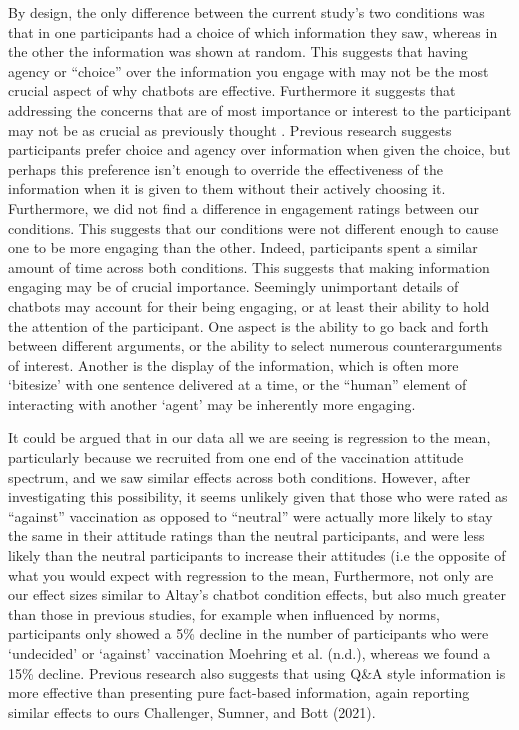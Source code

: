 \documentclass[
  english,
  ,jou,floatsintext]{apa6}
\begin{document}
By design, the only difference between the current study's two conditions was that in one participants had a choice of which information they saw, whereas in the other the information was shown at random. This suggests that having agency or ``choice'' over the information you engage with may not be the most crucial aspect of why chatbots are effective. Furthermore it suggests that addressing the concerns that are of most importance or interest to the participant may not be as crucial as previously thought . Previous research suggests participants prefer choice and agency over information when given the choice, but perhaps this preference isn't enough to override the effectiveness of the information when it is given to them without their actively choosing it. Furthermore, we did not find a difference in engagement ratings between our conditions. This suggests that our conditions were not different enough to cause one to be more engaging than the other. Indeed, participants spent a similar amount of time across both conditions. This suggests that making information engaging may be of crucial importance. Seemingly unimportant details of chatbots may account for their being engaging, or at least their ability to hold the attention of the participant. One aspect is the ability to go back and forth between different arguments, or the ability to select numerous counterarguments of interest. Another is the display of the information, which is often more `bitesize' with one sentence delivered at a time, or the ``human'' element of interacting with another `agent' may be inherently more engaging.

It could be argued that in our data all we are seeing is regression to the mean, particularly because we recruited from one end of the vaccination attitude spectrum, and we saw similar effects across both conditions. However, after investigating this possibility, it seems unlikely given that those who were rated as ``against'' vaccination as opposed to ``neutral'' were actually more likely to stay the same in their attitude ratings than the neutral participants, and were less likely than the neutral participants to increase their attitudes (i.e the opposite of what you would expect with regression to the mean, Furthermore, not only are our effect sizes similar to Altay's chatbot condition effects, but also much greater than those in previous studies, for example when influenced by norms, participants only showed a 5\% decline in the number of participants who were `undecided' or `against' vaccination Moehring et al. (n.d.), whereas we found a 15\% decline. Previous research also suggests that using Q\&A style information is more effective than presenting pure fact-based information, again reporting similar effects to ours Challenger, Sumner, and Bott (2021).
\end{document}
